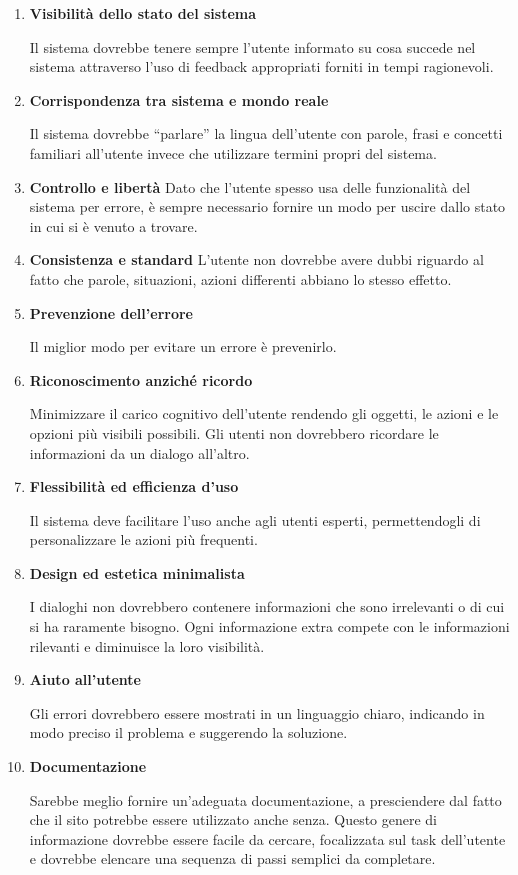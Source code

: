\documentclass[12pt,italian,]{report}
\begin{document}
\begin{enumerate}
\def\labelenumi{\arabic{enumi}.}
\item
  \textbf{Visibilità dello stato del sistema}

  Il sistema dovrebbe tenere sempre l'utente informato su cosa succede
  nel sistema attraverso l'uso di feedback appropriati forniti in tempi
  ragionevoli.
\item
  \textbf{Corrispondenza tra sistema e mondo reale}

  Il sistema dovrebbe ``parlare'' la lingua dell'utente con parole,
  frasi e concetti familiari all'utente invece che utilizzare termini
  propri del sistema.
\item
  \textbf{Controllo e libertà}
  Dato che l'utente spesso usa delle funzionalità del sistema per
  errore, è sempre necessario fornire un modo per uscire dallo stato in
  cui si è venuto a trovare.
\item
  \textbf{Consistenza e standard}
  L'utente non dovrebbe avere dubbi riguardo al fatto che parole,
  situazioni, azioni differenti abbiano lo stesso effetto.
\item
  \textbf{Prevenzione dell'errore}

  Il miglior modo per evitare un errore è prevenirlo.
\item
  \textbf{Riconoscimento anziché ricordo}

  Minimizzare il carico cognitivo dell'utente rendendo gli oggetti, le
  azioni e le opzioni più visibili possibili. Gli utenti non dovrebbero
  ricordare le informazioni da un dialogo all'altro.
\item
  \textbf{Flessibilità ed efficienza d'uso}

  Il sistema deve facilitare l'uso anche agli utenti esperti,
  permettendogli di personalizzare le azioni più frequenti.
\item
  \textbf{Design ed estetica minimalista}

  I dialoghi non dovrebbero contenere informazioni che sono irrelevanti
  o di cui si ha raramente bisogno. Ogni informazione extra compete con
  le informazioni rilevanti e diminuisce la loro visibilità.
\item
  \textbf{Aiuto all'utente}

  Gli errori dovrebbero essere mostrati in un linguaggio chiaro,
  indicando in modo preciso il problema e suggerendo la soluzione.
\item
  \textbf{Documentazione}


Sarebbe meglio fornire un'adeguata documentazione, a presciendere dal
fatto che il sito potrebbe essere utilizzato anche senza. Questo genere
di informazione dovrebbe essere facile da cercare, focalizzata sul task
dell'utente e dovrebbe elencare una sequenza di passi semplici da
completare.


\end{enumerate}
\end{document}
